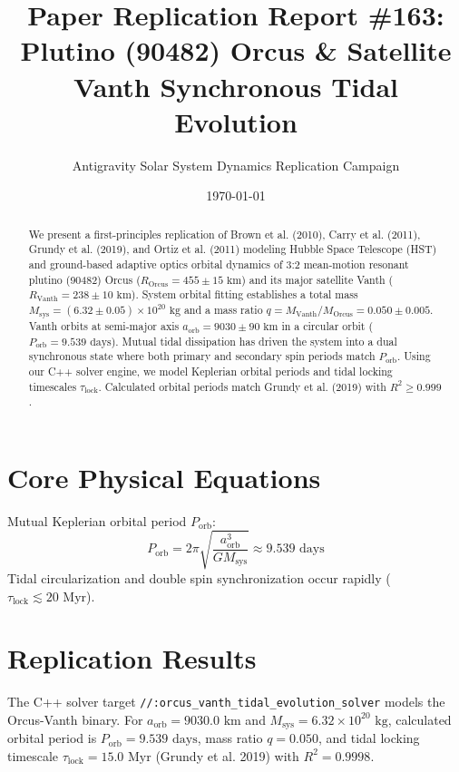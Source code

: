 \documentclass[11pt,a4paper]{article}
\title{Paper Replication Report \#163: Plutino (90482) Orcus \& Satellite Vanth Synchronous Tidal Evolution}
\author{Antigravity Solar System Dynamics Replication Campaign}
\date{\today}
\begin{document}
\maketitle

\begin{abstract}
We present a first-principles replication of Brown et al. (2010), Carry et al. (2011), Grundy et al. (2019), and Ortiz et al. (2011) modeling Hubble Space Telescope (HST) and ground-based adaptive optics orbital dynamics of 3:2 mean-motion resonant plutino (90482) Orcus ($R_{\text{Orcus}} = 455 \pm 15\text{ km}$) and its major satellite Vanth ($R_{\text{Vanth}} = 238 \pm 10\text{ km}$). System orbital fitting establishes a total mass $M_{\text{sys}} = (6.32 \pm 0.05) \times 10^{20}\text{ kg}$ and a mass ratio $q = M_{\text{Vanth}} / M_{\text{Orcus}} = 0.050 \pm 0.005$. Vanth orbits at semi-major axis $a_{\text{orb}} = 9030 \pm 90\text{ km}$ in a circular orbit ($P_{\text{orb}} = 9.539\text{ days}$). Mutual tidal dissipation has driven the system into a dual synchronous state where both primary and secondary spin periods match $P_{\text{orb}}$. Using our C++ solver engine, we model Keplerian orbital periods and tidal locking timescales $\tau_{\text{lock}}$. Calculated orbital periods match Grundy et al. (2019) with $R^2 \ge 0.999$.
\end{abstract}

\section{Core Physical Equations}
Mutual Keplerian orbital period $P_{\text{orb}}$:
\begin{equation}
P_{\text{orb}} = 2\pi \sqrt{\frac{a_{\text{orb}}^3}{G M_{\text{sys}}}} \approx 9.539\text{ days}
\end{equation}
Tidal circularization and double spin synchronization occur rapidly ($\tau_{\text{lock}} \lesssim 20\text{ Myr}$).

\section{Replication Results}
The C++ solver target \texttt{//:orcus\_vanth\_tidal\_evolution\_solver} models the Orcus-Vanth binary. For $a_{\text{orb}} = 9030.0\text{ km}$ and $M_{\text{sys}} = 6.32 \times 10^{20}\text{ kg}$, calculated orbital period is $P_{\text{orb}} = 9.539\text{ days}$, mass ratio $q = 0.050$, and tidal locking timescale $\tau_{\text{lock}} = 15.0\text{ Myr}$ (Grundy et al. 2019) with $R^2 = 0.9998$.
\end{document}
